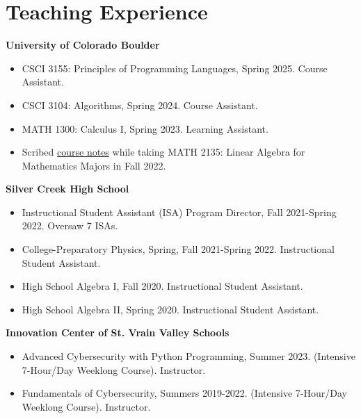 \documentclass[a4paper,20pt]{article}
\begin{document}
    \section{Teaching Experience}
      \textbf{University of Colorado Boulder}
      \begin{itemize}
        \vspace{-5pt}
        \item CSCI 3155: Principles of Programming Languages, Spring 2025. Course Assistant.
        \vspace{-5pt}
        \item CSCI 3104: Algorithms, Spring 2024. Course Assistant.
        \vspace{-5pt}
        \item MATH 1300: Calculus I, Spring 2023. Learning Assistant.
        \vspace{-5pt}
        \item Scribed \href{https://officialadithya.github.io/assets/pdf/course_materials/linearalgebra.pdf}{course notes} while taking MATH 2135: Linear Algebra for Mathematics Majors in Fall 2022.
        \vspace{-5pt}
      \end{itemize}
      \textbf{Silver Creek High School}
      \begin{itemize}
          \vspace{-5pt}
          \item Instructional Student Assistant (ISA) Program Director, Fall 2021-Spring 2022. Oversaw 7 ISAs.
          \vspace{-5pt}
          \item College-Preparatory Physics, Spring, Fall 2021-Spring 2022. Instructional Student Assistant. 
          \vspace{-5pt}
          \item High School Algebra I, Fall 2020. Instructional Student Assistant. 
          \vspace{-5pt}
          \item High School Algebra II, Spring 2020. Instructional Student Assistant.
          \vspace{-5pt}
        \end{itemize}
        \textbf{Innovation Center of St. Vrain Valley Schools}
        \begin{itemize}
          \vspace{-5pt}
          \item Advanced Cybersecurity with Python Programming, Summer 2023. (Intensive 7-Hour/Day Weeklong Course). Instructor.
          \vspace{-5pt}
          \item Fundamentals of Cybersecurity, Summers 2019-2022. (Intensive 7-Hour/Day Weeklong Course). Instructor.
        \end{itemize}
      
\end{document}
